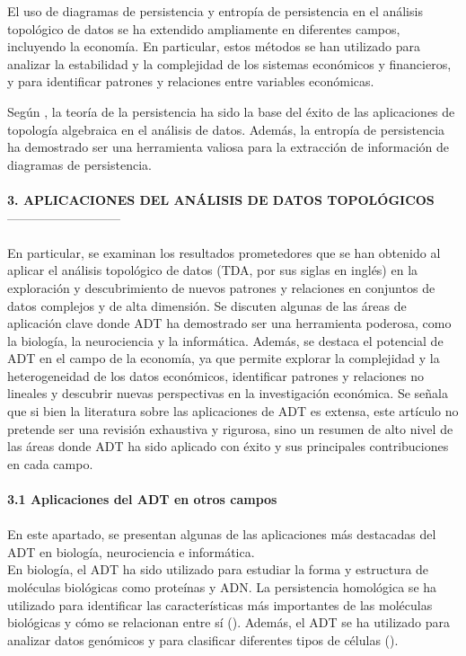 El uso de diagramas de persistencia y entropía de persistencia en el análisis topológico de datos se ha extendido ampliamente en diferentes campos, incluyendo la economía. En particular, estos métodos se han utilizado para analizar la estabilidad y la complejidad de los sistemas económicos y financieros, y para identificar patrones y relaciones entre variables económicas.

Según \cite{Carlsson2009TopologyAD}, la teoría de la persistencia ha sido la base del éxito de las aplicaciones de topología algebraica en el análisis de datos. Además, la entropía de persistencia ha demostrado ser una herramienta valiosa para la extracción de información de diagramas de persistencia.\\\\


\textbf{3. APLICACIONES DEL ANÁLISIS DE DATOS TOPOLÓGICOS}\\
---------------------------\\\\
En particular, se examinan los resultados prometedores que se han obtenido al aplicar el análisis topológico de datos (TDA, por sus siglas en inglés) en la exploración y descubrimiento de nuevos patrones y relaciones en conjuntos de datos complejos y de alta dimensión. Se discuten algunas de las áreas de aplicación clave donde ADT ha demostrado ser una herramienta poderosa, como la biología, la neurociencia y la informática. Además, se destaca el potencial de ADT en el campo de la economía, ya que permite explorar la complejidad y la heterogeneidad de los datos económicos, identificar patrones y relaciones no lineales y descubrir nuevas perspectivas en la investigación económica. Se señala que si bien la literatura sobre las aplicaciones de ADT es extensa, este artículo no pretende ser una revisión exhaustiva y rigurosa, sino un resumen de alto nivel de las áreas donde ADT ha sido aplicado con éxito y sus principales contribuciones en cada campo.\\\\

\textbf{3.1 Aplicaciones del ADT en otros campos}\\\\

En este apartado, se presentan algunas de las aplicaciones más destacadas del ADT en biología, neurociencia e informática.\\

En biología, el ADT ha sido utilizado para estudiar la forma y estructura de moléculas biológicas como proteínas y ADN. La persistencia homológica se ha utilizado para identificar las características más importantes de las moléculas biológicas y cómo se relacionan entre sí (\cite{Ghrist2007BarcodesTP}). Además, el ADT se ha utilizado para analizar datos genómicos y para clasificar diferentes tipos de células (\cite{nicolau2011topology}).\\

